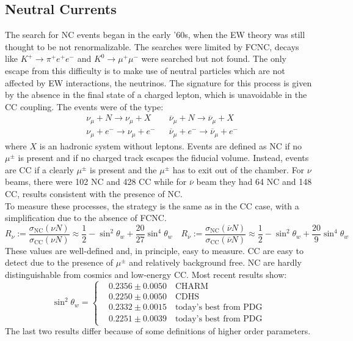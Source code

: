 \documentclass[10.75pt,a4paper,openright,bottom=2cm]{article}
\begin{document}
\subsection{Neutral Currents}
The search for NC events began in the early '60s, when the EW theory was still thought to be not renormalizable. The searches were limited by FCNC, decays like $K^+\to\pi^+e^+e^-$ and $K^0\to\mu^+\mu^-$ were searched but not found. The only escape from this difficulty is to make use of neutral particles which are not affected by EW interactions, the neutrinos. The signature for this process is given by the absence in the final state of a charged lepton, which is unavoidable in the CC coupling. The events were of the type:
\[
\begin{aligned}
&\nu_\mu+N\to\nu_\mu+X &&\overline{\nu}_\mu+N\to\overline{\nu}_\mu+X\\
&\nu_\mu+e^-\to\nu_\mu+e^- &&\overline{\nu}_\mu+e^-\to\overline{\nu}_\mu+e^-
\end{aligned}
\]
where $X$ is an hadronic system without leptons. Events are defined as NC if no $\mu^\pm$ is present and if no charged track escapes the fiducial volume. Instead, events are CC if a clearly $\mu^\pm$ is present and the $\mu^\pm$ has to exit out of the chamber. For $\nu$ beams, there were 102 NC and 428 CC while for $\overline{\nu}$ beam they had 64 NC and 148 CC, results consistent with the presence of NC.\\
To measure these processes, the strategy is the same as in the CC case, with a simplification due to the absence of FCNC.
\[
R_\nu:=\frac{\sigma_{\text{NC}}(\nu N)}{\sigma_{\text{CC}}(\nu N)}\approx\frac{1}{2}-\sin^2\theta_w+\frac{20}{27}\sin^4\theta_w \quad R_{\overline{\nu}}:=\frac{\sigma_{\text{NC}}(\overline{\nu} N)}{\sigma_{\text{CC}}(\overline{\nu} N)}\approx\frac{1}{2}-\sin^2\theta_w+\frac{20}{9}\sin^4\theta_w
\]
These values are well-defined and, in principle, easy to measure. CC are easy to detect due to the presence of $\mu^\pm$ and relatively background free. NC are hardly distinguishable from cosmics and low-energy CC. Most recent results show:
\[
\sin^2\theta_w=
\left\{
\begin{aligned}
&0.2356\pm0.0050 \quad \text{CHARM}\\
&0.2250\pm0.0050 \quad \text{CDHS}\\
&0.2332\pm0.0015 \quad \text{today's best from PDG}\\
&0.2251\pm0.0039 \quad \text{today's best from PDG}
\end{aligned}
\right.
\]
The last two results differ because of some definitions of higher order parameters.\\
\end{document}
